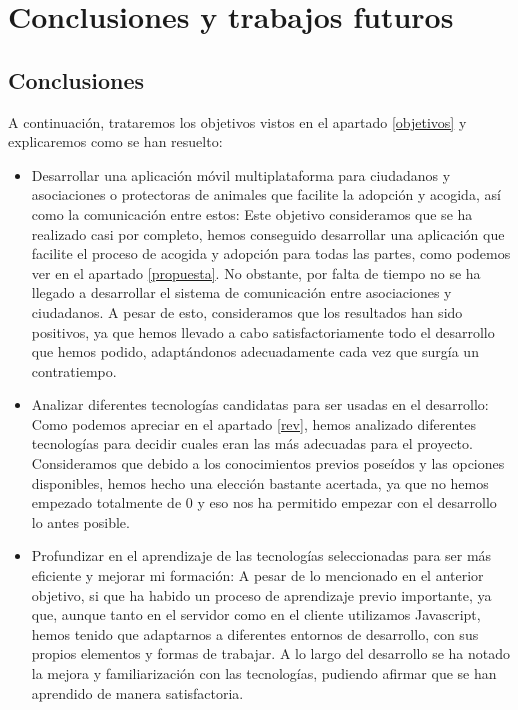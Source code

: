 \chapter{Conclusiones y trabajos futuros}

\section{Conclusiones}

A continuación, trataremos los objetivos vistos en el apartado \ref{objetivos} y explicaremos como se han resuelto:

\begin{itemize}
	\item Desarrollar una aplicación móvil multiplataforma para ciudadanos y asociaciones o protectoras de animales que facilite la adopción y acogida, así como la comunicación entre estos: Este objetivo consideramos que se ha realizado casi por completo, hemos conseguido desarrollar una aplicación que facilite el proceso de acogida y adopción para todas las partes, como podemos ver en el apartado \ref{propuesta}. No obstante, por falta de tiempo no se ha llegado a desarrollar el sistema de comunicación entre asociaciones y ciudadanos. A pesar de esto, consideramos que los resultados han sido positivos, ya que hemos llevado a cabo satisfactoriamente todo el desarrollo que hemos podido, adaptándonos adecuadamente cada vez que surgía un contratiempo.
	
	\item Analizar diferentes tecnologías candidatas para ser usadas en el desarrollo: Como podemos apreciar en el apartado \ref{rev}, hemos analizado diferentes tecnologías para decidir cuales eran las más adecuadas para el proyecto. Consideramos que debido a los conocimientos previos poseídos y las opciones disponibles, hemos hecho una elección bastante acertada, ya que no hemos empezado totalmente de 0 y eso nos ha permitido empezar con el desarrollo lo antes posible.
	
	\item Profundizar en el aprendizaje de las tecnologías seleccionadas para ser más eficiente y mejorar mi formación: A pesar de lo mencionado en el anterior objetivo, si que ha habido un proceso de aprendizaje previo importante, ya que, aunque tanto en el servidor como en el cliente utilizamos Javascript, hemos tenido que adaptarnos a diferentes entornos de desarrollo, con sus propios elementos y formas de trabajar. A lo largo del desarrollo se ha notado la mejora y familiarización con las tecnologías, pudiendo afirmar que se han aprendido de manera satisfactoria.
	

\end{itemize}
